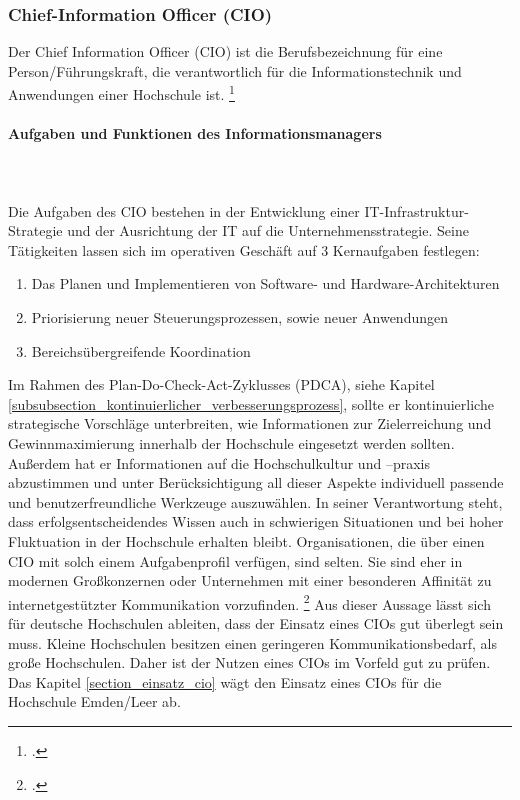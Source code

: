 \subsubsection{Chief-Information Officer (CIO)}
\label{subsection_cio}
Der Chief Information Officer (CIO) ist die Berufsbezeichnung für eine Person/Führungskraft, die verantwortlich für die Informationstechnik und Anwendungen einer Hochschule ist. \footcite[Vgl.][]{beuschel_2009}

\paragraph{Aufgaben und Funktionen des Informationsmanagers}\mbox{}\\\\
Die Aufgaben des CIO bestehen in der Entwicklung einer IT-Infrastruktur-Strategie und der Ausrichtung der IT auf die Unternehmensstrategie. Seine Tätigkeiten lassen sich im operativen Geschäft auf 3 Kernaufgaben festlegen: 
\begin{enumerate}
	\item Das Planen und Implementieren von Software- und Hardware-Architekturen 
	\item Priorisierung neuer Steuerungsprozessen, sowie neuer Anwendungen
	\item Bereichsübergreifende Koordination
\end{enumerate}

Im Rahmen des Plan-Do-Check-Act-Zyklusses (PDCA), siehe Kapitel  \ref{subsubsection_kontinuierlicher_verbesserungsprozess},  sollte er kontinuierliche strategische Vorschläge unterbreiten, wie Informationen zur Zielerreichung und Gewinnmaximierung innerhalb der Hochschule eingesetzt werden sollten. Außerdem hat er Informationen auf die Hochschulkultur und –praxis  abzustimmen und unter Berücksichtigung all dieser Aspekte individuell passende und benutzerfreundliche Werkzeuge auszuwählen. In seiner Verantwortung steht, dass erfolgsentscheidendes Wissen auch in schwierigen Situationen und bei hoher Fluktuation in der Hochschule erhalten bleibt. Organisationen, die über einen CIO mit solch einem Aufgabenprofil verfügen, sind selten. Sie sind eher in modernen Großkonzernen oder Unternehmen mit einer besonderen Affinität zu internetgestützter Kommunikation vorzufinden. \footcite[Vgl.][404]{becker_gora_uhrig_2012}
Aus dieser Aussage lässt sich für deutsche Hochschulen ableiten, dass der Einsatz eines CIOs gut überlegt sein muss. Kleine Hochschulen besitzen einen geringeren Kommunikationsbedarf, als große Hochschulen. Daher ist der Nutzen eines CIOs im Vorfeld gut zu prüfen. Das Kapitel \ref{section_einsatz_cio} wägt den Einsatz eines CIOs für die Hochschule Emden/Leer ab.


